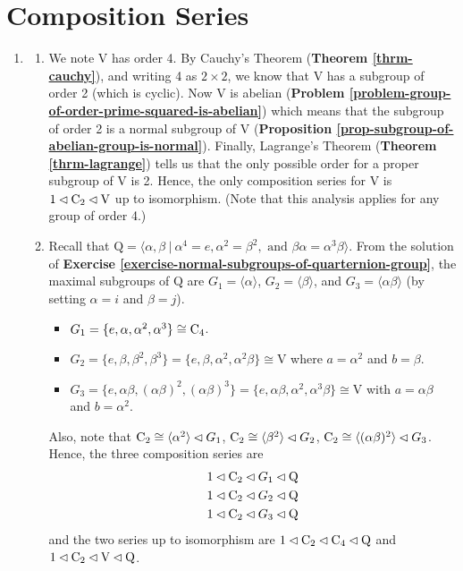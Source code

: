 \section{Composition Series}
\begin{enumerate}
    \item \begin{enumerate}[label=(\roman*)]
        \item We note $\mathrm{V}$ has order 4. By Cauchy's Theorem (\textbf{Theorem \ref{thrm-cauchy}}), and writing 4 as $2 \times 2$, we know that $\mathrm{V}$ has a subgroup of order 2 (which is cyclic). Now $\mathrm{V}$ is abelian (\textbf{Problem \ref{problem-group-of-order-prime-squared-is-abelian}}) which means that the subgroup of order 2 is a normal subgroup of $\mathrm{V}$ (\textbf{Proposition \ref{prop-subgroup-of-abelian-group-is-normal}}). Finally, Lagrange's Theorem (\textbf{Theorem \ref{thrm-lagrange}}) tells us that the only possible order for a proper subgroup of $\mathrm{V}$ is 2. Hence, the only composition series for $\mathrm{V}$ is $1 \lhd \mathrm{C}_{2} \lhd \mathrm{V}$ up to isomorphism.\newline
        (Note that this analysis applies for any group of order 4.)
        
        \item Recall that $\mathrm{Q} = \langle \alpha, \beta \ | \ \alpha^4 = e, \alpha^2 = \beta^2, \text{ and } \beta\alpha = \alpha^3\beta \rangle$. From the solution of \textbf{Exercise \ref{exercise-normal-subgroups-of-quarternion-group}}, the maximal subgroups of $\mathrm{Q}$ are $G_1 = \langle \alpha \rangle$, $G_2 = \langle \beta \rangle$, and $G_3 = \langle \alpha\beta \rangle$ (by setting $\alpha = i$ and $\beta = j$).
        \begin{itemize}
            \item $G_1 = \{e, \alpha, \alpha^2, \alpha^3\} \cong \mathrm{C}_{4}$.
            \item $G_2 = \{e, \beta, \beta^2, \beta^3\} = \{e, \beta, \alpha^2, \alpha^2\beta\} \cong \mathrm{V}$ where $a = \alpha^2$ and $b = \beta$.
            \item $G_3 = \{e, \alpha\beta, (\alpha\beta)^2, (\alpha\beta)^3\} = \{e, \alpha\beta, \alpha^2, \alpha^3\beta\} \cong \mathrm{V}$ with $a = \alpha\beta$ and $b = \alpha^2$.
        \end{itemize}
        Also, note that $\mathrm{C}_{2} \cong \langle \alpha^2 \rangle \lhd G_1$, $\mathrm{C}_{2} \cong \langle \beta^2 \rangle \lhd G_2$, $\mathrm{C}_{2} \cong \langle (\alpha\beta)^2 \rangle \lhd G_3$. Hence, the three composition series are
        \begin{align*}
            &1 \lhd \mathrm{C}_{2} \lhd G_1 \lhd \mathrm{Q}\\
            &1 \lhd \mathrm{C}_{2} \lhd G_2 \lhd \mathrm{Q}\\
            &1 \lhd \mathrm{C}_{2} \lhd G_3 \lhd \mathrm{Q}
        \end{align*}
        and the two series up to isomorphism are $1 \lhd \mathrm{C}_{2} \lhd \mathrm{C}_{4} \lhd \mathrm{Q}$ and $1 \lhd \mathrm{C}_{2} \lhd \mathrm{V} \lhd \mathrm{Q}$.
        

\end{enumerate}
\end{enumerate}
